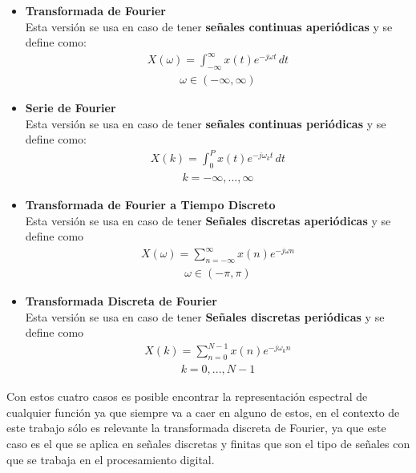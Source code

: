 \begin{itemize}
	\item[] \textbf{Transformada de Fourier}\\
	Esta versi\'on se usa en caso de tener \textbf{señales continuas aperi\'odicas} y se define como:
	\begin{align}
		X(\omega) =  \int_{-\infty}^{\infty} x(t)e^{-j\omega t} \,dt
	\end{align}
	\begin{align*}
		\omega \in (-\infty,\infty)
	\end{align*}
	\item[] \textbf{Serie de Fourier}\\
	Esta versi\'on se usa en caso de tener \textbf{señales continuas peri\'odicas} y se define como:
	\begin{align}
		X(k) =  \int_{0}^{P} x(t)e^{-j\omega_{k} t} \,dt
	\end{align}
	\begin{align*}
		k = -\infty, ..., \infty
	\end{align*}
	\item[] \textbf{Transformada de Fourier a Tiempo Discreto}\\
	Esta versi\'on se usa en caso de tener \textbf{Señales discretas aperi\'odicas}  y se define como
	\begin{align}
		X(\omega) = \sum_{n=-\infty}^{\infty} x(n)e^{-j\omega n}
	\end{align}
	\begin{align*}
		\omega \in (-\pi,\pi)
	\end{align*}
	\item[] \textbf{Transformada Discreta de Fourier}\\
	Esta versi\'on se usa en caso de tener \textbf{Señales discretas peri\'odicas}  y se define como\\
	\begin{align}
		X(k) = \sum_{n=0}^{N - 1} x(n)e^{-j\omega_{k} n}
	\end{align}
	\begin{align*}
		k = 0, ..., N - 1
	\end{align*}
	\setlength{\parskip}{2em}
\end{itemize}

Con estos cuatro casos es posible encontrar la representaci\'on espectral de cualquier funci\'on ya que siempre va a caer en alguno de estos, en el contexto de este trabajo s\'olo es relevante la transformada discreta de Fourier, ya que este caso es el que se aplica en señales discretas y finitas que son el tipo de señales con que se trabaja en el procesamiento digital.\\


